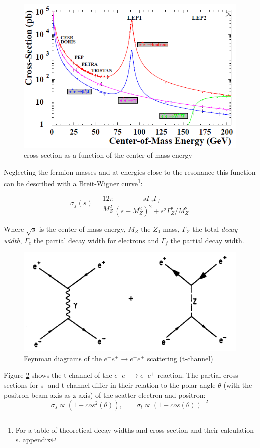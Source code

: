 \begin{figure}[H]
\centering
\includegraphics[width=\linewidth]{graphics/crosssection}
\caption{cross section as a function of the center-of-mass energy\cite{jakobs}}
\label{fig:principles:crosssection}
\end{figure}

 Neglecting the fermion masses and at energies close to the resonance this function can be described with a Breit-Wigner curve\footnote{For a table of theoretical decay widths and cross section and their calculation s. appendix}\cite{muenchen}:
 
\begin{equation}
\sigma_f(s) = \frac{12\pi}{M_Z^2} \frac{s\Gamma_e\Gamma_f}{(s-M_Z^2)^2+s^2\Gamma_Z^2/M_Z^2}
\label{eq:principles:breitwigner}
\end{equation}

Where $\sqrt{s}$ is the center-of-mass energy, $M_Z$ the $Z_0$ mass, $\Gamma_Z$ the total \emph{decay width}, $\Gamma_e$ the partial decay width for electrons and $\Gamma_f$ the partial decay width.
\begin{figure}[H]
	\centering
	\includegraphics{graphics/BhabbaStreuung.png}
	\caption{Feynman diagrams of the $e^-e^+ \rightarrow e^-e^+$ scattering (t-channel)}
	\label{fig:principles:BhabbaStreuung.png}
\end{figure}
Figure \ref{fig:principles:BhabbaStreuung.png} shows the t-channel of the  $e^-e^+ \rightarrow e^-e^+$ reaction. The partial cross sections for s- and t-channel differ in their relation to the polar angle $\theta$ (with the positron beam axis as z-axis) of the scatter electron and positron\cite{anleitung}:
\begin{equation}
\sigma_s \propto (1+cos^2(\theta)),\qquad\sigma_t \propto (1-cos(\theta))^{-2}
\label{eq:principles:s-t-channel}
\end{equation}
